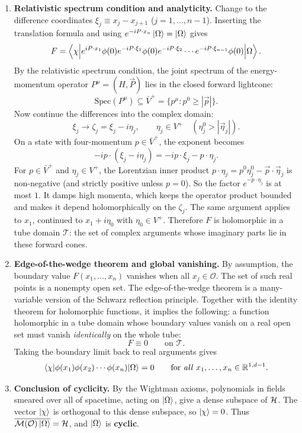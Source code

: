 \begin{keyresult}
\begin{enumerate}[leftmargin=*]
\item \textbf{Relativistic spectrum condition and analyticity.}
Change to the difference coordinates $\xi_j \equiv x_j - x_{j+1}$ ($j = 1, \dots, n-1$). Inserting the
translation formula and using $e^{-iP\cdot x_n}\ket\Omega=\ket\Omega$ gives
\[
F = \Braket{\chi \Big| e^{iP\cdot x_1}\phi(0) e^{-i P \cdot \xi_1} \phi(0) e^{-i P \cdot \xi_2}
\cdots e^{-i P \cdot \xi_{n-1}} \phi(0) \Big| \Omega} .
\]
By the relativistic spectrum condition, the joint spectrum of the energy-momentum operator
$P^\mu = (H, \vec P)$ lies in the closed forward lightcone:
\[
\mathrm{Spec}(P^\mu) \subseteq \bar V^+ = \{p^\mu : p^0 \ge |\vec p|\} .
\]
Now continue the differences into the complex domain:
\[
\xi_j \longrightarrow \zeta_j = \xi_j - i \eta_j, \qquad \eta_j \in V^+ \quad (\eta_j^0 > |\vec \eta_j|) .
\]
On a state with four-momentum $p \in \bar V^+$, the exponent becomes
\[
-i p \cdot (\xi_j - i \eta_j) = -i p \cdot \xi_j - p \cdot \eta_j .
\]
For $p \in \bar V^+$ and $\eta_j \in V^+$, the Lorentzian inner product
$p \cdot \eta_j = p^0 \eta_j^0 - \vec p \cdot \vec\eta_j$ is non-negative (and strictly positive unless
$p=0$). So the factor $e^{-p \cdot \eta_j}$ is at most $1$. It damps high momenta, which keeps the operator
product bounded and makes it depend holomorphically on the $\zeta_j$. The same argument applies to $x_1$,
continued to $x_1+i\eta_0$ with $\eta_0\in V^+$. Therefore $F$ is holomorphic in a tube domain $\mathcal T$:
the set of complex arguments whose imaginary parts lie in these forward cones.

\item \textbf{Edge-of-the-wedge theorem and global vanishing.}
By assumption, the boundary value $F(x_1, \dots, x_n)$ vanishes when all $x_j \in \mathcal{O}$. The set of
such real points is a nonempty open set. The edge-of-the-wedge theorem is a many-variable version of the
Schwarz reflection principle. Together with the identity theorem for holomorphic functions, it implies the
following: a function holomorphic in a tube domain whose boundary values vanish on a real open set must vanish
\emph{identically} on the whole tube:
\[
F \equiv 0 \qquad \text{on } \mathcal{T} .
\]
Taking the boundary limit back to real arguments gives
\[
\braket{\chi | \phi(x_1)\phi(x_2)\cdots\phi(x_n)|\Omega} = 0 \qquad
\text{for \emph{all}} \ x_1, \dots, x_n \in \mathbb{R}^{1,d-1} .
\]

\item \textbf{Conclusion of cyclicity.}
By the Wightman axioms, polynomials in fields smeared over all of spacetime, acting on $\ket\Omega$, give a
dense subspace of $\mathcal{H}$. The vector $\ket\chi$ is orthogonal to this dense subspace, so $\ket\chi = 0$. Thus
$\overline{\mathcal{M}(\mathcal{O})\ket\Omega} = \mathcal{H}$, and $\ket\Omega$ is \textbf{cyclic}.


\end{enumerate}
\end{keyresult}

